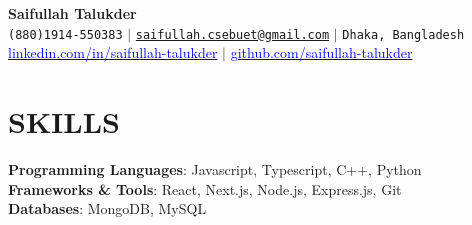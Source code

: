 \documentclass[letterpaper,10pt]{article}
\begin{document}
\begin{center}
    \textbf{\Huge Saifullah Talukder} \\ \vspace{5pt}
    \small \faPhone* \texttt{(880)1914-550383} \hspace{1pt} $|$
    \hspace{1pt} \faEnvelope \hspace{2pt} \texttt{\href{mailto:saifullah.cse16.buet@gmail.com}{saifullah.csebuet@gmail.com}} \hspace{1pt} $|$ 
    \hspace{1pt} \faMapMarker* \hspace{2pt}\texttt{Dhaka, Bangladesh}
    \\ \vspace{5pt}
    \hspace{1pt} \faLinkedin \hspace{2pt} \href{https://www.linkedin.com/in/saifullah-talukder}{\textcolor{blue}{linkedin.com/in/saifullah-talukder}} \hspace{1pt} $|$
    \hspace{1pt} \faGithub \hspace{2pt} \href{https://github.com/saifullah-talukder}{\textcolor{blue}{github.com/saifullah-talukder}} \hspace{1pt} %
    \\ \vspace{-5pt}
\end{center}

\section{SKILLS}
 \begin{itemize}[leftmargin=0in, label={}]
    \small{\item{
     \textbf{Programming Languages}: \hspace{1pt} {Javascript, Typescript, C++, Python}\vspace{2pt} \\
     \textbf{Frameworks \& Tools}: \hspace{22pt} {React, Next.js, Node.js, Express.js, Git}\vspace{2pt} \\
     \textbf{Databases}: \hspace{64pt} {MongoDB, MySQL}
    }}
 \end{itemize}
\end{document}
